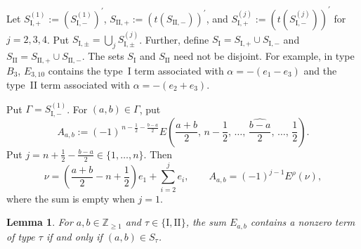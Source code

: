 \documentclass[11pt,a4paper]{amsart}
\newcommand{\ZZ}{\mathbb Z}
\theoremstyle{plain}
\newtheorem{lem}[theorem]{Lemma}
\numberwithin{equation}{section}
\begin{document}
Let $S_{\mathrm{I},+}^{(1)}:=(S_{\mathrm{I},-}^{(1)})^{\prime}$,
$S_{\mathrm{II},+}:=(t(S_{\mathrm{II},-}))^{\prime}$, and
$S_{\mathrm{I},+}^{(j)}:=(t(S_{\mathrm{I},-}^{(j)}))^{\prime}$ for $j=2,3,4$. Put
$S_{\mathrm{I},\pm}=\bigcup_j S_{\mathrm{I},\pm}^{(j)}$. Further, define
\(S_{\mathrm{I}}=S_{\mathrm{I},+}\cup S_{\mathrm{I},-}\) and
\(S_{\mathrm{II}}=S_{\mathrm{II},+}\cup S_{\mathrm{II},-}\).
The sets \(S_{\mathrm I}\) and \(S_{\mathrm{II}}\) need not be disjoint. For example, in type \(B_3\),
\(E_{3,10}\) contains the type~\(\mathrm{I}\) term associated with
\(\alpha=-(e_1-e_3)\) and the type~\(\mathrm{II}\) term associated with
\(\alpha=-(e_2+e_3)\).

Put \(\Gamma=S_{\mathrm I,-}^{(1)}\).
For \((a,b)\in\Gamma\), put
\[
A_{a,b}
:=(-1)^{\,n-\frac12-\frac{b-a}{2}}
E\!\left(
\frac{a+b}{2},\,
n-\frac12,\,
\dots,\,
\widehat{\frac{b-a}{2}},\,
\dots,\,
\frac12
\right).
\]
Put \(j=n+\tfrac12-\tfrac{b-a}{2}\in\{1,\ldots,n\}\).
Then
\[
\nu=\left(\frac{a+b}{2}-n+\frac12\right)e_1
+\sum_{i=2}^{j}e_i,
\qquad
A_{a,b}=(-1)^{j-1}E^\rho(\nu),
\]
where the sum is empty when \(j=1\).

\begin{lem}\label{nonzero term set}
For \(a,b\in\ZZ_{\ge1}\) and
\(\tau\in\{\mathrm I,\mathrm{II}\}\), the sum \(E_{a,b}\)
contains a nonzero term of type \(\tau\) if and only if
\((a,b)\in S_\tau\).
\end{lem}
\end{document}
